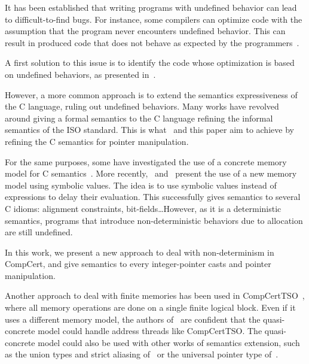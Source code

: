 It has been established that writing programs with undefined behavior can lead to difficult-to-find bugs.
For instance, some compilers can optimize code with the assumption that the program never encounters undefined behavior. This can result in produced code that does not behave as expected by the programmers~\cite{DBLP:conf/apsys/WangCCJZK12}.

A first solution to this issue is to identify the code whose optimization is based on undefined behaviors, as presented in~\cite{DBLP:conf/sosp/WangZKS13}.

However, a more common approach is to extend the semantics expressiveness of the C language, ruling out undefined behaviors.
Many works have revolved around giving a formal semantics to the C language refining the informal semantics of the ISO standard.
This is what~\cite{DBLP:conf/pldi/KangHMGZV15} and this paper aim to achieve by refining the C semantics for pointer manipulation.

For the same purposes, some have investigated the use of a concrete memory model for C semantics~\cite{DBLP:conf/popl/TuchKN07}\cite{Norrish98cformalised}.
More recently,~\cite{besson:hal-01093312} and~\cite{DBLP:conf/itp/BessonBW15} present the use of a new memory model using symbolic values. The idea is to use symbolic values instead of expressions to delay their evaluation. This successfully gives semantics to several C idioms: alignment constraints, bit-fields\dots However, as it is a deterministic semantics, programs that introduce non-deterministic behaviors due to allocation are still undefined.

In this work, we present a new approach to deal with non-determinism in CompCert, and give semantics to every integer-pointer casts and pointer manipulation.

Another approach to deal with finite memories has been used in CompCertTSO~\cite{DBLP:journals/jacm/SevcikVNJS13}, where all memory operations are done on a single finite logical block. Even if it uses a different memory model, the authors of~\cite{DBLP:conf/pldi/KangHMGZV15} are confident that the quasi-concrete model could handle address threads like CompCertTSO.
The quasi-concrete model could also be used with other works of semantics extension, such as the union types and strict aliasing of~\cite{DBLP:conf/cpp/Krebbers13} or the universal pointer type of~\cite{DBLP:conf/itp/KrebbersLW14}.
